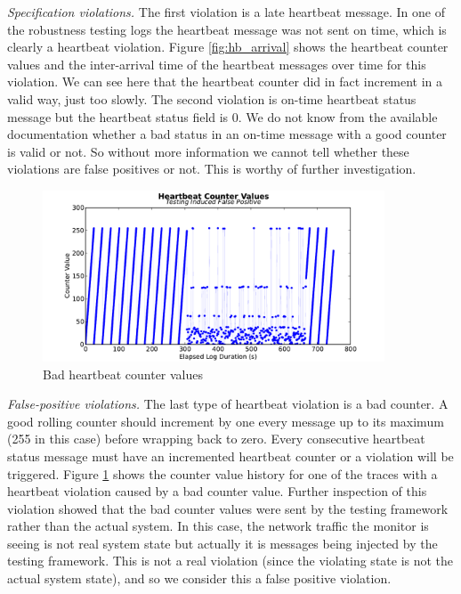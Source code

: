 \textit{Specification violations.}
The first violation is a late heartbeat message. In one of the robustness testing logs the heartbeat message was not sent on time, which is clearly a heartbeat violation. Figure \ref{fig:hb_arrival} shows the heartbeat counter values and the inter-arrival time of the heartbeat messages over time for this violation. We can see here that the heartbeat counter did in fact increment in a valid way, just too slowly.
The second violation is on-time heartbeat status message but the heartbeat status field is 0.
We do not know from the available documentation whether a bad status in an on-time message with a good counter is valid or not. So without more information we cannot tell whether these violations are false positives or not. This is worthy of further investigation.


\begin{figure}[htbp]
\centering
\includegraphics[width=4.0in]{img/hb2}
\caption{Bad heartbeat counter values \label{fig:hb_badcounter}}
\end{figure}

\textit{False-positive violations.}
The last type of heartbeat violation is a bad counter.
A good rolling counter should increment by one every message up to its maximum (255 in this case) before wrapping back to zero.
Every consecutive heartbeat status message must have an incremented heartbeat counter or a violation will be triggered. Figure \ref{fig:hb_badcounter} shows the counter value history for one of the traces with a heartbeat violation caused by a bad counter value.
%
Further inspection of this violation showed that the bad counter values were sent by the testing framework rather than the actual system. In this case, the network traffic the monitor is seeing is not real system state but actually it is messages being injected by the testing framework. This is not a real violation (since the violating state is not the actual system state), and so we consider this a false positive violation.



